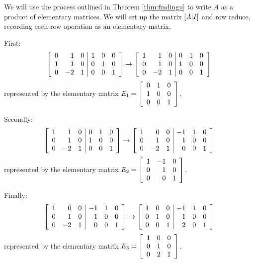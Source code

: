 \begin{solution}
We will use the process outlined in Theorem \ref{thm:findingu} to write $A$ as a product of elementary matrices. We will set up the matrix $\left[ A | I \right]$ and row reduce, recording each row operation as an elementary matrix. 

First: 
\[
 \left[
\begin{array}{rrr|rrr}
0 & 1 & 0 & 1 & 0 & 0 \\
1 & 1 & 0 & 0 & 1 & 0 \\
0 & -2 & 1 & 0 & 0 & 1 
\end{array} \right]
\rightarrow 
 \left[
\begin{array}{rrr|rrr}
1 & 1 & 0 & 0 & 1 & 0 \\
0 & 1 & 0 & 1 & 0 & 0 \\
0 & -2 & 1 & 0 & 0 & 1 
\end{array} \right]
\]
represented by the elementary matrix $E_1= \left[
\begin{array}{rrr}
0 & 1 & 0 \\
1 & 0 & 0 \\
0 & 0 & 1 
\end{array} \right]$.

Secondly:
\[
\left[
\begin{array}{rrr|rrr}
1 & 1 & 0 & 0 & 1 & 0 \\
0 & 1 & 0 & 1 & 0 & 0 \\
0 & -2 & 1 & 0 & 0 & 1 
\end{array} \right]
\rightarrow 
 \left[
\begin{array}{rrr|rrr}
1 & 0 & 0 & -1 & 1 & 0 \\
0 & 1 & 0 & 1 & 0 & 0 \\
0 & -2 & 1 & 0 & 0 & 1 
\end{array} \right]
\]
represented by the elementary matrix
$E_2 =  \left[
\begin{array}{rrr}
1 & -1 & 0 \\
0 & 1 & 0 \\
0 & 0 & 1 
\end{array} \right]$.

Finally:
\[
\left[
\begin{array}{rrr|rrr}
1 & 0& 0 & -1 & 1 & 0 \\
0 & 1 & 0 & 1 & 0 & 0 \\
0 & -2 & 1 & 0 & 0 & 1 
\end{array} \right]
\rightarrow 
 \left[
\begin{array}{rrr|rrr}
1 & 0 & 0 &-1 & 1 & 0\\
0 & 1 & 0 & 1 & 0 & 0 \\
0 & 0 & 1 & 2 & 0 & 1 
\end{array} \right]
\]
represented by the elementary matrix $E_3=  \left[
\begin{array}{rrr}
1 & 0 & 0 \\
0 & 1 & 0 \\
0 & 2 & 1 
\end{array} \right]$.


\end{solution}
